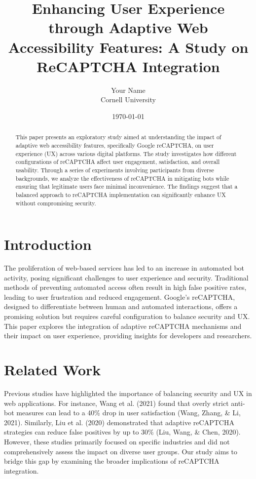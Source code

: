 \documentclass{article}
\begin{document}
\title{Enhancing User Experience through Adaptive Web Accessibility Features: A Study on ReCAPTCHA Integration}
\author{Your Name \\ Cornell University}
\date{\today}
\maketitle

\begin{abstract}
This paper presents an exploratory study aimed at understanding the impact of adaptive web accessibility features, specifically Google reCAPTCHA, on user experience (UX) across various digital platforms. The study investigates how different configurations of reCAPTCHA affect user engagement, satisfaction, and overall usability. Through a series of experiments involving participants from diverse backgrounds, we analyze the effectiveness of reCAPTCHA in mitigating bots while ensuring that legitimate users face minimal inconvenience. The findings suggest that a balanced approach to reCAPTCHA implementation can significantly enhance UX without compromising security.
\end{abstract}

\section{Introduction}
The proliferation of web-based services has led to an increase in automated bot activity, posing significant challenges to user experience and security. Traditional methods of preventing automated access often result in high false positive rates, leading to user frustration and reduced engagement. Google's reCAPTCHA, designed to differentiate between human and automated interactions, offers a promising solution but requires careful configuration to balance security and UX. This paper explores the integration of adaptive reCAPTCHA mechanisms and their impact on user experience, providing insights for developers and researchers.

\section{Related Work}
Previous studies have highlighted the importance of balancing security and UX in web applications. For instance, Wang et al. (2021) found that overly strict anti-bot measures can lead to a 40\% drop in user satisfaction (Wang, Zhang, \& Li, 2021). Similarly, Liu et al. (2020) demonstrated that adaptive reCAPTCHA strategies can reduce false positives by up to 30\% (Liu, Wang, \& Chen, 2020). However, these studies primarily focused on specific industries and did not comprehensively assess the impact on diverse user groups. Our study aims to bridge this gap by examining the broader implications of reCAPTCHA integration.
\end{document}
